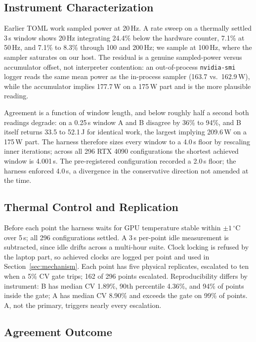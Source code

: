 \documentclass[conference]{IEEEtran}
\begin{document}
\subsection{Instrument Characterization}

Earlier TOML work sampled power at 20\,Hz. A rate sweep on a thermally
settled 3\,s window shows 20\,Hz integrating 24.4\% below the hardware
counter, 7.1\% at 50\,Hz, and 7.1\% to 8.3\% through 100 and 200\,Hz; we
sample at 100\,Hz, where the sampler saturates on our host. The residual is
a genuine sampled-power versus accumulator offset, not interpreter
contention: an out-of-process \texttt{nvidia-smi} logger reads the same
mean power as the in-process sampler (163.7 vs.\ 162.9\,W), while the
accumulator implies 177.7\,W on a 175\,W part and is the more plausible
reading.

Agreement is a function of window length, and below roughly half a second
both readings degrade: on a 0.25\,s window A and B disagree by 36\% to
94\%, and B itself returns 33.5 to 52.1\,J for identical work, the largest
implying 209.6\,W on a 175\,W part. The harness therefore sizes every
window to a 4.0\,s floor by rescaling inner iterations; across all 296 RTX
4090 configurations the shortest achieved window is 4.001\,s. The
pre-registered configuration recorded a 2.0\,s floor; the harness enforced
4.0\,s, a divergence in the conservative direction not amended at the
time.

\subsection{Thermal Control and Replication}

Before each point the harness waits for GPU temperature stable within $\pm
1\,^{\circ}$C over 5\,s; all 296 configurations settled. A 3\,s per-point
idle measurement is subtracted, since idle drifts across a multi-hour suite.
Clock locking is refused by the laptop part, so achieved clocks are logged
per point and used in Section~\ref{sec:mechanism}. Each point has five
physical replicates, escalated to ten when a 5\% CV gate trips; 162 of 296
points escalated. Reproducibility differs by instrument: B has median CV
1.89\%, 90th percentile 4.36\%, and 94\% of points inside the gate; A has
median CV 8.90\% and exceeds the gate on 99\% of points. A, not the primary,
triggers nearly every escalation.

\subsection{Agreement Outcome}
\end{document}
